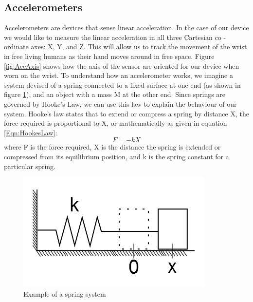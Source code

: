 \subsection{Accelerometers}
\label{Sec:Accelerometer}
Accelerometers are devices that sense linear acceleration.
In the case of our device we would like to measure the linear acceleration in all three Cartesian co - ordinate axes: X, Y, and Z.
This will allow us to track the movement of the wrist in free living humans as their hand moves around in free space.
Figure \ref{fig:AccAxis} shows how the axis of the sensor are oriented for our device when worn on the wrist.
To understand how an accelerometer works,
we imagine a system devised of a spring connected to a fixed surface at one end (as shown in figure \ref{fig:HookeSpring}),
and an object with a mass M at the other end.
Since springs are governed by Hooke's Law, we can use this law to explain the behaviour of our system.
Hooke's law states that to extend or compress a spring by distance X,
the force required is proportional to X, or mathematically as given in equation \ref{Eqn:HookesLaw}:
\begin{equation}
\label{Eqn:HookesLaw}
F = -kX 
\end{equation}
where F is the force required, X is the distance the spring is extended or compressed from its equilibrium position, and k is the spring constant for a particular spring.
\begin{figure}
\begin{center}
\includegraphics{images/HookesLaw.png}
\caption{Example of a spring system}
\label{fig:HookeSpring}
\end{center}
\end{figure}

